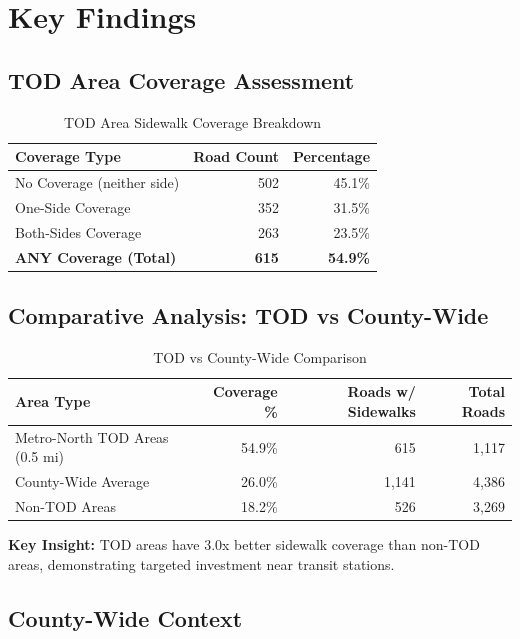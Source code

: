 \documentclass[11pt,letterpaper]{article}
\begin{document}
\section{Key Findings}

\subsection{TOD Area Coverage Assessment}

\begin{table}[h]
\centering
\begin{tabular}{lrr}
\toprule
\textbf{Coverage Type} & \textbf{Road Count} & \textbf{Percentage} \\
\midrule
No Coverage (neither side) & 502 & 45.1\% \\
One-Side Coverage & 352 & 31.5\% \\
Both-Sides Coverage & 263 & 23.5\% \\
\midrule
\textbf{ANY Coverage (Total)} & \textbf{615} & \textbf{54.9\%} \\
\bottomrule
\end{tabular}
\caption{TOD Area Sidewalk Coverage Breakdown}
\end{table}

\subsection{Comparative Analysis: TOD vs County-Wide}

\begin{table}[h]
\centering
\begin{tabular}{lrrr}
\toprule
\textbf{Area Type} & \textbf{Coverage \%} & \textbf{Roads w/ Sidewalks} & \textbf{Total Roads} \\
\midrule
Metro-North TOD Areas (0.5 mi) & 54.9\% & 615 & 1,117 \\
County-Wide Average & 26.0\% & 1,141 & 4,386 \\
Non-TOD Areas & 18.2\% & 526 & 3,269 \\
\bottomrule
\end{tabular}
\caption{TOD vs County-Wide Comparison}
\end{table}

\textbf{Key Insight:} TOD areas have 3.0x better sidewalk coverage than non-TOD areas, demonstrating targeted investment near transit stations.

\subsection{County-Wide Context}
\end{document}
